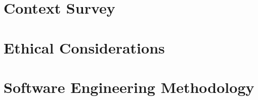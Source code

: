 \documentclass[
12pt, %
oneside, %
english, %
singlespacing, %
liststotoc, %
toctotoc, %
headsepline, %
]{MastersDoctoralThesis} %
\def\chapterinput#1{}
\begin{document}



\mainmatter %

\pagestyle{thesis}

\chapter{Context Survey}
\chapterinput{context_survey.tex}

\chapter{Ethical Considerations}
\chapterinput{ethics.tex}

\chapter{Software Engineering Methodology}
\chapterinput{software_engineering.tex}


\appendix

% 


\printbibliography[heading=bibintoc]

\end{document}
